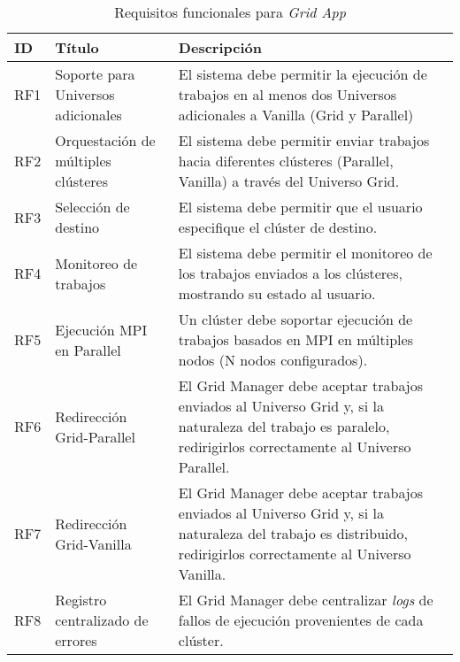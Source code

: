 \begin{table}[H]
	\centering
	\sffamily\scriptsize
	\setlength{\tabcolsep}{4pt}
	\renewcommand{\arraystretch}{1.3}
	\caption{Requisitos funcionales para \textit{Grid App}}
	\label{table:requisitosFuncionales}
	\begin{tabular}{|p{}|p{}|p{}|}
		\toprule
		\textbf{ID}                              & \textbf{Título}                               & \textbf{Descripción} \\
		\midrule
		RF1 & Soporte para Universos adicionales & El sistema debe permitir la ejecución de trabajos en al menos dos Universos adicionales a Vanilla (Grid y Parallel) \\
		\midrule
		RF2 & Orquestación de múltiples clústeres & El sistema debe permitir enviar trabajos hacia diferentes clústeres (Parallel, Vanilla) a través del Universo Grid. \\
		\midrule
		RF3 & Selección de destino & El sistema debe permitir que el usuario especifique el clúster de destino. \\
		\midrule
		RF4 & Monitoreo de trabajos & El sistema debe permitir el monitoreo de los trabajos enviados a los clústeres, mostrando su estado al usuario. \\
		\midrule
		RF5 & Ejecución MPI en Parallel & Un clúster debe soportar ejecución de trabajos basados en MPI en múltiples nodos (N nodos configurados). \\
		\midrule
		RF6 & Redirección Grid-Parallel & El Grid Manager debe aceptar trabajos enviados al Universo Grid y, si la naturaleza del trabajo es paralelo, redirigirlos correctamente al Universo Parallel. \\
        \midrule
		RF7 & Redirección Grid-Vanilla & El Grid Manager debe aceptar trabajos enviados al Universo Grid y, si la naturaleza del trabajo es distribuido, redirigirlos correctamente al Universo Vanilla. \\
        \midrule
		RF8 & Registro centralizado de errores & El Grid Manager debe centralizar \textit{logs} de fallos de ejecución provenientes de cada clúster. \\
		\bottomrule
	\end{tabular}
\end{table}